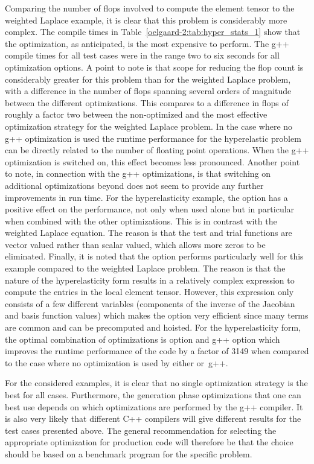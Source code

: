 Comparing the number of flops involved to compute the element tensor
to the weighted Laplace example, it is clear that this problem is
considerably more complex.  The \ffc{} compile times in
Table~\ref{oelgaard-2:tab:hyper_stats_1} show that the 
optimization, as anticipated, is the most expensive to perform.  The
g++ compile times for all test cases were in the range two to six
seconds for all optimization options.  A point to note is that scope
for reducing the flop count is considerably greater for this problem
than for the weighted Laplace problem, with a difference in the number
of flops spanning several orders of magnitude between the different
\ffc{} optimizations.  This compares to a difference in flops of
roughly a factor two between the non-optimized and the most effective
optimization strategy for the weighted Laplace problem.  In the case
where no g++ optimization is used the runtime performance for the
hyperelastic problem can be directly related to the number of floating
point operations.  When the g++ optimization  is switched on,
this effect becomes less pronounced.  Another point to note, in
connection with the g++ optimizations, is that switching on additional
optimizations beyond  does not seem to provide any further
improvements in run time.  For the hyperelasticity example, the option
 has a positive effect on the performance, not only when
used alone but in particular when combined with the other \ffc{}
optimizations.  This is in contrast with the weighted Laplace
equation. The reason is that the test and trial functions are vector
valued rather than scalar valued, which allows more zeros to be
eliminated.  Finally, it is noted that the  option
performs particularly well for this example compared to the weighted
Laplace problem.  The reason is that the nature of the hyperelasticity
form results in a relatively complex expression to compute the entries
in the local element tensor.  However, this expression only consists
of a few different variables (components of the inverse of the
Jacobian and basis function values) which makes the 
option very efficient since many terms are common and can be
precomputed and hoisted.  For the hyperelasticity form, the optimal
combination of optimizations is \ffc{} option  and
g++ option  which improves the runtime
performance of the code by a factor of 3149 when compared to the case
where no optimization is used by either \ffc{} or~g++.

For the considered examples, it is clear that no single optimization
strategy is the best for all cases.  Furthermore, the generation phase
optimizations that one can best use depends on which optimizations are
performed by the g++ compiler.  It is also very likely that different
C++ compilers will give different results for the test cases presented
above.  The general recommendation for selecting the appropriate
optimization for production code will therefore be that the choice
should be based on a benchmark program for the specific problem.

